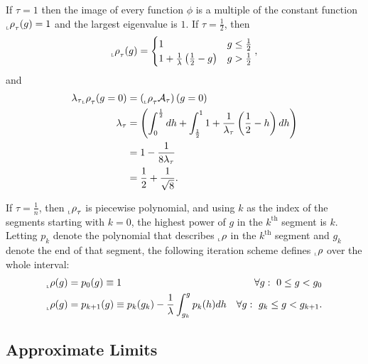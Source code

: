 \documentclass[12pt]{article} \usepackage{amsmath,amsfonts}
\newcommand{\Aop}{{\cal A}}
\newcommand{\function}{\phi}
\newcommand{\leftfunction}{{_{_{\scalebox{.4}{L}}} \rho}}
\renewcommand{\th}{^{\text{th}}}
\begin{document}
If $\tau = 1$ then the image of every function $\function$ is a
multiple of the constant function $\leftfunction_\tau(g) = 1$ and the
largest eigenvalue is $1$.  If $\tau = \frac{1}{2}$, then
\begin{equation*}
  \leftfunction_\tau(g) =
  \begin{cases}
    1 & g \leq \frac{1}{2} \\
    1 + \frac{1}{\lambda}\left( \frac{1}{2} - g \right) & g > \frac{1}{2}
  \end{cases},
\end{equation*}
and
\begin{align*}
  \lambda_\tau \leftfunction_\tau (g=0) &= \left( \leftfunction_\tau
                                          \Aop_\tau \right) (g=0) \\ 
  \lambda_\tau &= \left( \int_0^{\frac{1}{2}} dh + \int_{\frac{1}{2}}^1
                1 + \frac{1}{\lambda_\tau}\left( \frac{1}{2} - h \right)
                dh \right) \\
  &= 1 - \frac{1}{8 \lambda_\tau} \\
              &= \frac{1}{2} + \frac{1}{\sqrt{8}}.
\end{align*}

If $\tau = \frac{1}{n}$, then $\leftfunction_\tau$ is piecewise
polynomial, and using $k$ as the index of the segments starting with
$k=0$, the highest power of $g$ in the $k\th$ segment is $k$.  Letting
$p_k$ denote the polynomial that describes $\leftfunction$ in the
$k\th$ segment and $g_k$ denote the end of that segment, the following
iteration scheme defines $\leftfunction$ over the whole interval:
\begin{align*}
  \leftfunction(g) &= p_0(g) \equiv 1 &\forall g:~ 0\leq g < g_0 \\
  \leftfunction(g) &= p_{k+1}(g) \equiv p_k(g_k) - \frac{1}{\lambda}
                      \int_{g_k}^g p_k(h) dh
                                 &\forall g:~ g_k \leq g < g_{k+1}.
\end{align*}

\subsection{Approximate Limits}
\label{sec:limits}
\end{document}
